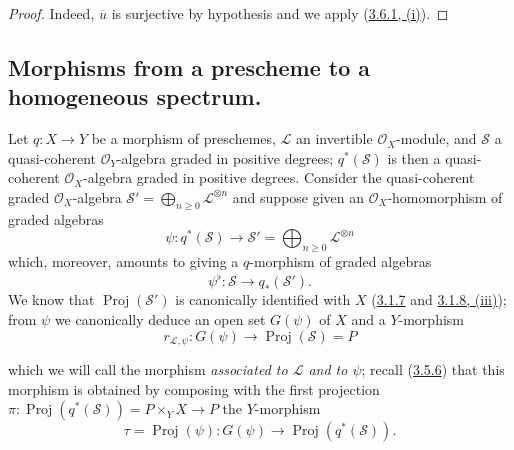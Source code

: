 \begin{proof}
Indeed, $\overline{u}$ is surjective by hypothesis and we apply
(\hyperref[II.3.6.1]{3.6.1, (i)}).
\end{proof}

\subsection{Morphisms from a prescheme to a homogeneous spectrum.}
\label{subsection:II.3.7}

\begin{env}[3.7.1]
\label{II.3.7.1}
Let $q:X\to Y$ be a morphism of preschemes, $\mathcal{L}$ an invertible
$\mathcal{O}_X$-module, and $\mathcal{S}$ a quasi-coherent $\mathcal{O}_Y$-algebra
graded in positive degrees; $q^*(\mathcal{S})$ is then a quasi-coherent
$\mathcal{O}_X$-algebra graded in positive degrees.
Consider the quasi-coherent graded $\mathcal{O}_X$-algebra
$\mathcal{S}'=\bigoplus_{n\geq0}\mathcal{L}^{\otimes n}$ and suppose given
an $\mathcal{O}_X$-homomorphism of graded algebras
\[
  \psi:q^*(\mathcal{S})\longrightarrow
  \mathcal{S}'=\bigoplus_{n\geq0}\mathcal{L}^{\otimes n}
\]
which, moreover, amounts to giving a $q$-morphism of graded algebras
\[
  \psi^\flat:\mathcal{S}\longrightarrow q_*(\mathcal{S}').
\]
We know that $\operatorname{Proj}(\mathcal{S}')$ is canonically identified with
$X$ (\hyperref[II.3.1.7]{3.1.7} and
\hyperref[II.3.1.8]{3.1.8, (iii)}); from $\psi$ we canonically deduce an
open set $G(\psi)$ of $X$ and a $Y$-morphism
\[
\label{II.3.7.1.1}
  r_{\mathcal{L},\psi}:G(\psi)\longrightarrow
  \operatorname{Proj}(\mathcal{S})=P
\tag{3.7.1.1}
\]


which we will call the morphism \emph{associated to $\mathcal{L}$ and to $\psi$};
recall (\hyperref[II.3.5.6]{3.5.6}) that this morphism is obtained by
composing with the first projection
$\pi:\operatorname{Proj}(q^*(\mathcal{S}))=P\times_YX\to P$ the
$Y$-morphism
\[
  \tau=\operatorname{Proj}(\psi):G(\psi)\longrightarrow
  \operatorname{Proj}(q^*(\mathcal{S})).
\]
\end{env}

